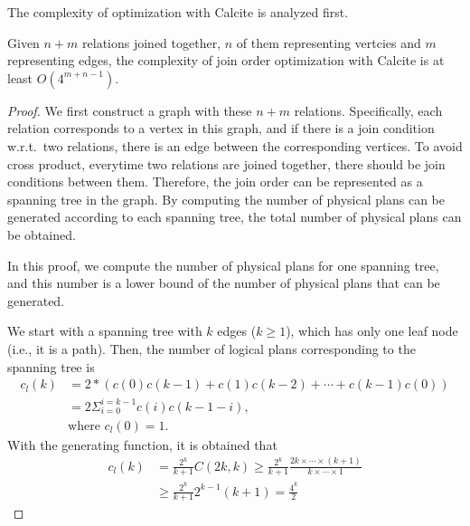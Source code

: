 The complexity of optimization with Calcite is analyzed first.
\begin{theorem}
    \label{theorem:complexity-of-calcite}
    Given $n + m$ relations joined together, $n$ of them representing vertcies and $m$ representing edges, the complexity of join order optimization with Calcite is at least $O(4^{m+n-1})$.
\end{theorem}
\begin{proof}
    We first construct a graph with these $n + m$ relations.
    Specifically, each relation corresponds to a vertex in this graph, and if there is a join condition w.r.t.~two relations, there is an edge between the corresponding vertices.
    To avoid cross product, everytime two relations are joined together, there should be join conditions between them.
    Therefore, the join order can be represented as a spanning tree in the graph.
    By computing the number of physical plans can be generated according to each spanning tree, the total number of physical plans can be obtained.

    In this proof, we compute the number of physical plans for one spanning tree, and this number is a lower bound of the number of physical plans that can be generated.

    We start with a spanning tree with $k$ edges ($k \geq 1$), which has only one leaf node (i.e., it is a path).
    Then, the number of logical plans corresponding to the spanning tree is
    \begin{equation*}
        \begin{split}
            c_l(k) & = 2 * (c(0)c(k-1) + c(1)c(k-2) + \cdots + c(k-1)c(0)) \\
            & = 2\Sigma_{i=0}^{i=k-1}c(i)c(k-1-i), \\
            & \text{where } c_l(0) = 1.
        \end{split}
    \end{equation*}
    With the generating function, it is obtained that
    \begin{equation*}
        \begin{split}
            c_l(k) & = \frac{2^k}{k+1}C(2k, k) \geq \frac{2^k}{k+1}\frac{2k \times \cdots \times (k+1)}{k \times \cdots \times 1} \\
            & \geq \frac{2^k}{k+1}2^{k-1}(k+1) = \frac{4^k}{2}
        \end{split}
    \end{equation*}


\end{proof}
